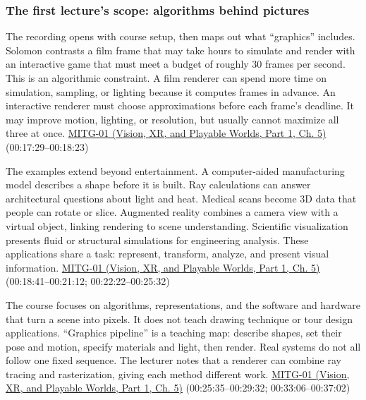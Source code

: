\subsubsection{The first lecture's scope: algorithms behind pictures}\label{03-visual-computing-i-ch001-the-first-lectures-scope-algorithms-behind-pictures}

\hypertarget{03-visual-computing-i-ch001-the-first-lectures-scope-algorithms-behind-pictures}{}

The recording opens with course setup, then maps out what ``graphics'' includes. Solomon contrasts a film frame that may take hours to simulate and render with an interactive game that must meet a budget of roughly 30 frames per second. This is an algorithmic constraint. A film renderer can spend more time on simulation, sampling, or lighting because it computes frames in advance. An interactive renderer must choose approximations before each frame's deadline. It may improve motion, lighting, or resolution, but usually cannot maximize all three at once. \href{../07-Vision-XR-and-Playable-Worlds-P01/main.pdf\#nameddest=04-visual-computing-ii-ch036-mitg-01---introduction}{MITG-01 (Vision, XR, and Playable Worlds, Part 1, Ch. 5)} (00:17:29--00:18:23)

The examples extend beyond entertainment. A computer-aided manufacturing model describes a shape before it is built. Ray calculations can answer architectural questions about light and heat. Medical scans become 3D data that people can rotate or slice. Augmented reality combines a camera view with a virtual object, linking rendering to scene understanding. Scientific visualization presents fluid or structural simulations for engineering analysis. These applications share a task: represent, transform, analyze, and present visual information. \href{../07-Vision-XR-and-Playable-Worlds-P01/main.pdf\#nameddest=04-visual-computing-ii-ch036-mitg-01---introduction}{MITG-01 (Vision, XR, and Playable Worlds, Part 1, Ch. 5)} (00:18:41--00:21:12; 00:22:22--00:25:32)

The course focuses on algorithms, representations, and the software and hardware that turn a scene into pixels. It does not teach drawing technique or tour design applications. ``Graphics pipeline'' is a teaching map: describe shapes, set their pose and motion, specify materials and light, then render. Real systems do not all follow one fixed sequence. The lecturer notes that a renderer can combine ray tracing and rasterization, giving each method different work. \href{../07-Vision-XR-and-Playable-Worlds-P01/main.pdf\#nameddest=04-visual-computing-ii-ch036-mitg-01---introduction}{MITG-01 (Vision, XR, and Playable Worlds, Part 1, Ch. 5)} (00:25:35--00:29:32; 00:33:06--00:37:02)

